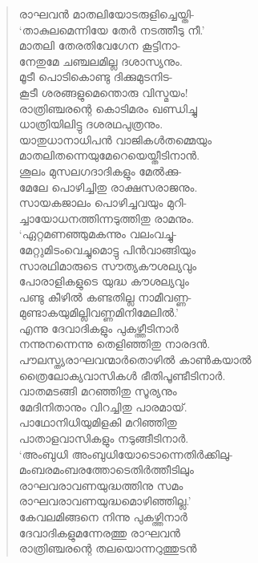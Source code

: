 \begin{verse}
രാഘവന്‍ മാതലിയോടരുളിച്ചെയ്തി-\\
‘താകുലമെന്നിയേ തേര്‍ നടത്തീടു നീ.’\\
മാതലി തേരതിവേഗേന കൂട്ടിനാ-\\
നേതുമേ ചഞ്ചലമില്ല ദശാസ്യനും.\\
മൂടീ പൊടികൊണ്ടു ദിക്കുമുടനിട-\\
കൂടീ ശരങ്ങളുമെന്തൊരു വിസ്മയം!\\
രാത്രിഞ്ചരന്റെ കൊടിമരം ഖണ്ഡിച്ചു\\
ധാത്രിയിലിട്ടു ദശരഥപുത്രനും.\\
യാതുധാനാധിപന്‍ വാജികള്‍തമ്മെയും\\
മാതലിതന്നെയുമേറെയെയ്തീടിനാന്‍.\\
ശൂലം മുസലഗദാദികളും മേല്‍ക്കു-\\
മേലേ പൊഴിച്ചിതു രാക്ഷസരാജനും.\\
സായകജാലം പൊഴിച്ചവയും മുറി-\\
ച്ചായോധനത്തിന്നടുത്തിതു രാമനും.\\
‘ഏറ്റമണഞ്ഞുമകന്നും വലംവച്ചു-\\
മേറ്റുമിടംവെച്ചുമൊട്ടു പിന്‍വാങ്ങിയും\\
സാരഥിമാരുടെ സൗത്യകൗശല്യവും\\
പോരാളികളുടെ യുദ്ധ കൗശല്യവും\\
പണ്ടു കീഴില്‍ കണ്ടതില്ല നാമീവണ്ണ-\\
മുണ്ടാകയുമില്ലിവണ്ണമിനിമേലില്‍.’\\
എന്നു ദേവാദികളും പുകഴ്ത്തീടിനാര്‍\\
നന്നുനന്നെന്നു തെളിഞ്ഞിതു നാരദന്‍.\\
പൗലസ്ത്യരാഘവന്മാര്‍‍തൊഴില്‍ കാണ്‍കയാല്‍\\
ത്രൈലോക്യവാസികള്‍ ഭീതിപൂണ്ടീടിനാര്‍.\\
വാതമടങ്ങി മറഞ്ഞിതു സൂര്യനും\\
മേദിനിതാനും വിറച്ചിതു പാരമായ്.\\
പാഥോനിധിയുമിളകി മറിഞ്ഞിതു\\
പാതാളവാസികളും നടുങ്ങീടിനാര്‍.\\
‘അംബുധി അംബുധിയോടൊന്നെതിര്‍ക്കിലു-\\
മംബരമംബരത്തോടെതിര്‍ത്തീടിലും\\
രാഘവരാവണയുദ്ധത്തിനു സമം\\
രാഘവരാവണയുദ്ധമൊഴിഞ്ഞില്ല.’\\
കേവലമിങ്ങനെ നിന്നു പുകഴ്ത്തിനാര്‍\\
ദേവാദികളുമന്നേരത്തു രാഘവന്‍\\
രാത്രിഞ്ചരന്റെ തലയൊന്നറുത്തുടന്‍\\

\end{verse}
